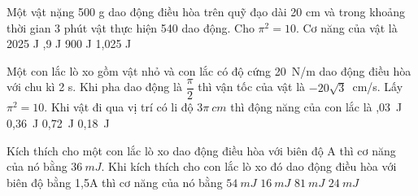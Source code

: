\begin{vidu}%
Một vật nặng 500 g dao động điều hòa trên quỹ đạo dài 20 cm và trong khoảng thời gian 3 phút vật thực hiện 540 dao động. Cho $\pi^2 = 10$. Cơ năng của vật là
\choice
{2025 J}
{,9 J}
{900 J}
{1,025 J}
\end{vidu} %

\begin{vidu} %
 Một con lắc lò xo gồm vật nhỏ và con lắc có độ cứng 20\ N/m dao động điều hòa với chu kì 2 s. Khi pha dao động là $\dfrac{\pi}{2}$ thì vận tốc của vật là $-20\sqrt{3}$\ cm/s. Lấy $\pi^2=10$. Khi vật đi qua vị trí có li độ $3\pi\ cm$ thì động năng của con lắc là
\choice
{,03\ J}
{0,36\ J}
{0,72\ J}
{0,18\ J}
\end{vidu} %

\begin{vidu} %
Kích thích cho một con lắc lò xo dao động điều hòa với biên độ A thì cơ năng của nó bằng $36\ mJ$. Khi kích thích cho con lắc lò xo đó dao động điều hòa với biên độ bằng 1,5A thì cơ năng của nó bằng
\choice
{$54\ mJ$}
{$16\ mJ$}
{\True $81\ mJ$}
{$24\ mJ$}
\end{vidu} %


